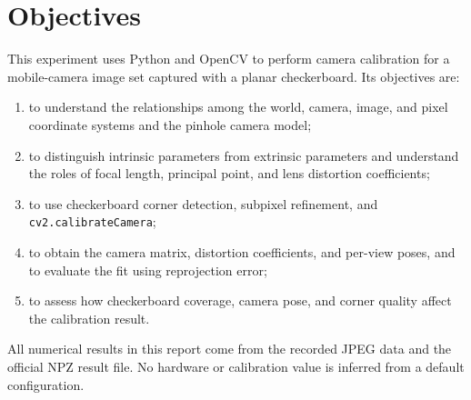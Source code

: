 \section{Objectives}\label{sec:task2-purpose}

This experiment uses Python and OpenCV to perform camera calibration for a mobile-camera image set captured with a planar checkerboard. Its objectives are:

\begin{enumerate}
    \item to understand the relationships among the world, camera, image, and pixel coordinate systems and the pinhole camera model;
    \item to distinguish intrinsic parameters from extrinsic parameters and understand the roles of focal length, principal point, and lens distortion coefficients;
    \item to use checkerboard corner detection, subpixel refinement, and \texttt{cv2.calibrateCamera};
    \item to obtain the camera matrix, distortion coefficients, and per-view poses, and to evaluate the fit using reprojection error;
    \item to assess how checkerboard coverage, camera pose, and corner quality affect the calibration result.
\end{enumerate}

All numerical results in this report come from the recorded JPEG data and the official NPZ result file. No hardware or calibration value is inferred from a default configuration.

